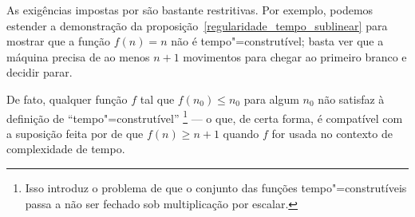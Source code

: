 As exigências impostas por 
são bastante restritivas.
Por exemplo,
podemos estender a demonstração da proposição~\ref{regularidade_tempo_sublinear}
para mostrar que a função $f(n) = n$
não é tempo"=construtível;
basta ver que a máquina precisa de ao menos $n+1$ movimentos
para chegar ao primeiro branco e decidir parar.

De fato, qualquer função $f$ tal que $f(n_0) \leq n_0$ para algum $n_0$
não satisfaz à definição de ``tempo"=construtível''%
\footnote{
    Isso introduz o problema de que o conjunto das funções tempo"=construtíveis
    passa a não ser fechado sob multiplicação por escalar.
}
--- o que, de certa forma,
é compatível com a suposição feita por 
de que $f(n) \geq n+1$
quando $f$ for usada no contexto de complexidade de tempo.
